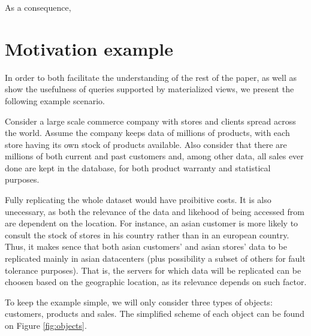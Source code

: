 \documentclass{vldb}
\begin{document}
As a consequence, 







\section{Motivation example}
\label{sec:example}


In order to both facilitate the understanding of the rest of the paper, as well as show the usefulness of queries supported by materialized views, we present the following example scenario.

Consider a large scale commerce company with stores and clients spread across the world.
Assume the company keeps data of millions of products, with each store having its own stock of products available.
Also consider that there are millions of both current and past customers and, among other data, all sales ever done are kept in the database, for both product warranty and statistical purposes.

Fully replicating the whole dataset would have proibitive costs.
It is also unecessary, as both the relevance of the data and likehood of being accessed from are dependent on the location.
For instance, an asian customer is more likely to consult the stock of stores in his country rather than in an european country.
Thus, it makes sence that both asian customers' and asian stores' data to be replicated mainly in asian datacenters (plus possibility a subset of others for fault tolerance purposes).
That is, the servers for which data will be replicated can be choosen based on the geographic location, as its relevance depends on such factor.

To keep the example simple, we will only consider three types of objects: customers, products and sales.
The simplified scheme of each object can be found on Figure \ref{fig:objects}.
\end{document}
